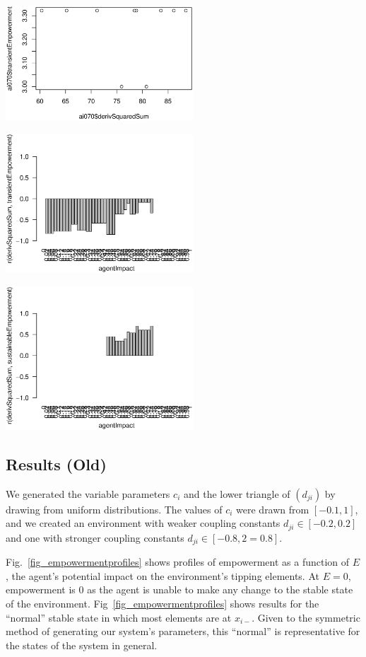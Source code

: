 \documentclass[conference]{IEEEtran}
\begin{document}
\centerline{\includegraphics[width=7cm]{n08_chain_large_corr_dss_emp_ai070.eps}}

\centerline{\includegraphics[width=7cm]{n08_chain_large_corr_dss_emp.eps}}

\centerline{\includegraphics[width=7cm]{n08_chain_large_corr_dss_empsust.eps}}


\cleardoublepage


\subsection{Results (Old)}

We generated the variable parameters $c_i$ and the lower triangle of
$(d_{ji})$ by drawing from uniform distributions. The values of $c_i$
were drawn from $[-0.1, 1]$, and we created an environment with weaker
coupling constants $d_{ji} \in [-0.2, 0.2]$ and one with stronger
coupling constants $d_{ji} \in [-0.8, 2=0.8]$.

Fig.~\ref{fig_empowermentprofiles} shows profiles of empowerment as a
function of $E$, the agent's potential impact on the environment's
tipping elements. At $E = 0$, empowerment is $0$ as the agent is
unable to make any change to the stable state of the environment.
Fig~\ref{fig_empowermentprofiles} shows results for the ``normal''
stable state in which most elements are at $x_{i-}$. Given to the
symmetric method of generating our system's parameters, this
``normal'' is representative for the states of the system in general.
\end{document}
